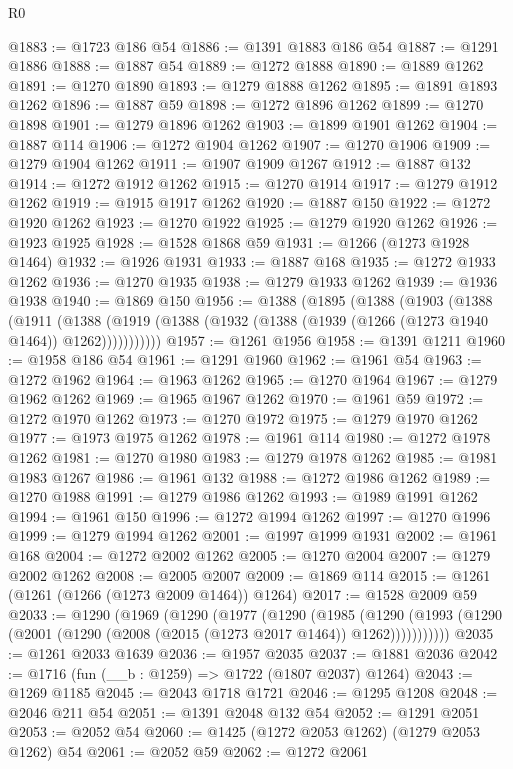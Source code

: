\begin{lexlean}{R0}
\begin{coremodule}
@1883 := @1723 @186 @54
@1886 := @1391 @1883 @186 @54
@1887 := @1291 @1886
@1888 := @1887 @54
@1889 := @1272 @1888
@1890 := @1889 @1262
@1891 := @1270 @1890
@1893 := @1279 @1888 @1262
@1895 := @1891 @1893 @1262
@1896 := @1887 @59
@1898 := @1272 @1896 @1262
@1899 := @1270 @1898
@1901 := @1279 @1896 @1262
@1903 := @1899 @1901 @1262
@1904 := @1887 @114
@1906 := @1272 @1904 @1262
@1907 := @1270 @1906
@1909 := @1279 @1904 @1262
@1911 := @1907 @1909 @1267
@1912 := @1887 @132
@1914 := @1272 @1912 @1262
@1915 := @1270 @1914
@1917 := @1279 @1912 @1262
@1919 := @1915 @1917 @1262
@1920 := @1887 @150
@1922 := @1272 @1920 @1262
@1923 := @1270 @1922
@1925 := @1279 @1920 @1262
@1926 := @1923 @1925
@1928 := @1528 @1868 @59
@1931 := @1266 (@1273 @1928 @1464)
@1932 := @1926 @1931
@1933 := @1887 @168
@1935 := @1272 @1933 @1262
@1936 := @1270 @1935
@1938 := @1279 @1933 @1262
@1939 := @1936 @1938
@1940 := @1869 @150
@1956 := @1388
    (@1895
      (@1388
        (@1903
          (@1388
            (@1911
              (@1388 (@1919 (@1388 (@1932 (@1388 (@1939 (@1266 (@1273 @1940 @1464)) @1262)))))))))))
@1957 := @1261 @1956
@1958 := @1391 @1211
@1960 := @1958 @186 @54
@1961 := @1291 @1960
@1962 := @1961 @54
@1963 := @1272 @1962
@1964 := @1963 @1262
@1965 := @1270 @1964
@1967 := @1279 @1962 @1262
@1969 := @1965 @1967 @1262
@1970 := @1961 @59
@1972 := @1272 @1970 @1262
@1973 := @1270 @1972
@1975 := @1279 @1970 @1262
@1977 := @1973 @1975 @1262
@1978 := @1961 @114
@1980 := @1272 @1978 @1262
@1981 := @1270 @1980
@1983 := @1279 @1978 @1262
@1985 := @1981 @1983 @1267
@1986 := @1961 @132
@1988 := @1272 @1986 @1262
@1989 := @1270 @1988
@1991 := @1279 @1986 @1262
@1993 := @1989 @1991 @1262
@1994 := @1961 @150
@1996 := @1272 @1994 @1262
@1997 := @1270 @1996
@1999 := @1279 @1994 @1262
@2001 := @1997 @1999 @1931
@2002 := @1961 @168
@2004 := @1272 @2002 @1262
@2005 := @1270 @2004
@2007 := @1279 @2002 @1262
@2008 := @2005 @2007
@2009 := @1869 @114
@2015 := @1261 (@1261 (@1266 (@1273 @2009 @1464)) @1264)
@2017 := @1528 @2009 @59
@2033 := @1290
    (@1969
      (@1290
        (@1977
          (@1290
            (@1985
              (@1290 (@1993 (@1290 (@2001 (@1290 (@2008 (@2015 (@1273 @2017 @1464)) @1262)))))))))))
@2035 := @1261 @2033 @1639
@2036 := @1957 @2035
@2037 := @1881 @2036
@2042 := @1716 (fun (__b : @1259) => @1722 (@1807 @2037) @1264)
@2043 := @1269 @1185
@2045 := @2043 @1718 @1721
@2046 := @1295 @1208
@2048 := @2046 @211 @54
@2051 := @1391 @2048 @132 @54
@2052 := @1291 @2051
@2053 := @2052 @54
@2060 := @1425 (@1272 @2053 @1262) (@1279 @2053 @1262) @54
@2061 := @2052 @59
@2062 := @1272 @2061

\end{coremodule}
\end{lexlean}
